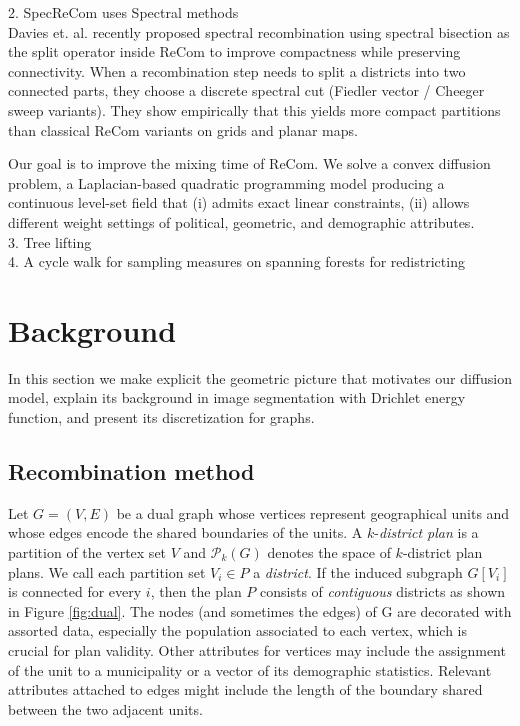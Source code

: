 \documentclass[11pt]{article}
\begin{document}
2. SpecReCom uses Spectral methods \cite{davies2025spectral} \\
Davies et. al. recently proposed spectral recombination using spectral bisection as the split operator inside ReCom to improve compactness while preserving connectivity. When a recombination step needs to split a districts into two connected parts, they choose a discrete spectral cut (Fiedler vector / Cheeger sweep variants). They show empirically that this yields more compact partitions than classical ReCom variants on grids and planar maps. 

 Our goal is to improve the mixing time of ReCom. We solve a convex diffusion problem, a Laplacian-based quadratic programming model producing a continuous level-set field that (i) admits exact linear constraints, (ii) allows different weight settings of political, geometric, and demographic attributes. \\

3. Tree lifting \cite{mcwhorter2025marked} \\

4. A cycle walk for sampling measures on spanning forests for redistricting \cite{deford2025cycle} \\


\section{Background}\label{sec:background}

In this section we make explicit the geometric picture that motivates our diffusion model, explain its background in image segmentation with Drichlet energy function, and present its discretization for graphs.

\subsection{Recombination method}\label{sec:recom}
Let $G=(V,E)$ be a dual graph whose vertices represent geographical units and whose edges encode the shared boundaries of the units. A $k$-\textit{district plan} is a partition of the vertex set $V$ and $\mathcal P_k(G)$ denotes the space of $k$-district plan plans. We call each partition set $V_i \in P$ a \textit{district}. If the induced subgraph $G[V_i]$ is connected for every $i$, then the plan $P$ consists of \textit{contiguous} districts as shown in Figure \ref{fig:dual}. The nodes (and sometimes the edges) of G are decorated with assorted data, especially the population associated to each vertex, which is crucial for plan validity. Other attributes for vertices may include the assignment of the unit to a municipality or a vector of its demographic statistics. Relevant attributes attached to edges might include the length of the boundary shared between the two adjacent units.
\end{document}
